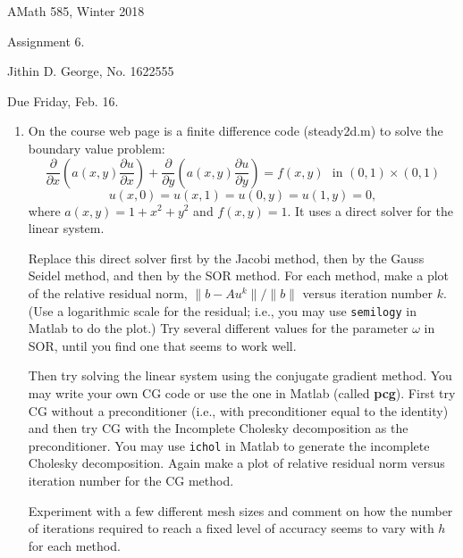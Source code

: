 \documentclass[letterpaper,12pt]{article}
\begin{document}




\noindent
{\scriptsize AMath 585, Winter 2018} \hfill 

\begin{center}
\large
Assignment 6.
\normalsize

Jithin D. George, No. 1622555
\end{center}

\noindent
Due Friday, Feb. 16.
\vspace{.3in}




\noindent


\begin{enumerate}
\item
On the course web page
is a finite difference code (steady2d.m) to solve the boundary value
problem:
\[
\frac{\partial}{\partial x} \left( a(x,y) \frac{\partial u}{\partial x}
\right) +
\frac{\partial}{\partial y} \left( a(x,y) \frac{\partial u}{\partial y}
\right) = f(x,y)~~~\mbox{in } (0,1) \times (0,1)
\]
\[
u(x,0) = u(x,1) = u(0,y) = u(1,y) = 0 ,
\]
where $a(x,y) = 1 + x^2 + y^2$ and $f(x,y) = 1$.
It uses a direct solver for the linear system.

Replace this direct solver first by the Jacobi method, then by the Gauss
Seidel method, and then by the SOR method.
For each method, make a plot of the relative residual norm,
$\| b - A u^k \| / \| b \|$ versus iteration number $k$.
(Use a logarithmic scale for the residual; i.e., you may use \verb+semilogy+
in Matlab to do the plot.)
Try several different values for the parameter $\omega$ in SOR,
until you find one that seems to work well.

Then try solving the linear system using the conjugate gradient
method.  You may write your own CG code or use the one in Matlab
(called {\bf pcg}).  First try CG without a preconditioner
(i.e., with preconditioner equal to the identity) and then try CG
with the Incomplete Cholesky decomposition as the preconditioner.
You may use \verb+ichol+ in Matlab to generate the incomplete Cholesky 
decomposition.  Again make a plot of relative residual norm versus 
iteration number for the CG method.

Experiment with a few different mesh sizes and comment on how the
number of iterations required to reach a fixed level of accuracy
seems to vary with $h$ for each method.


\end{enumerate}
\end{document}
